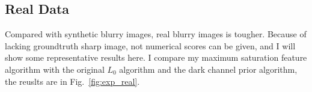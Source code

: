 \documentclass[journal, onecolumn, 10pt]{IEEEtran}
\begin{document}
\subsection{Real Data}
\label{sec:exp_real}
Compared with synthetic blurry images, real blurry images is tougher. Because of lacking groundtruth sharp image, not numerical scores can be given, and I will show some representative results here. I compare my maximum saturation feature algorithm with the original $L_0$ \cite{xu2013unnatural} algorithm and the dark channel prior algorithm\cite{pan2016blind}, the reuslts are in Fig.~\ref{fig:exp_real}.
\begin{figure}[h!]
\centering
{}\hspace{\fill}
\hspace{\fill}
\hspace{\fill}
\hspace{\fill}

\end{figure}
\end{document}
